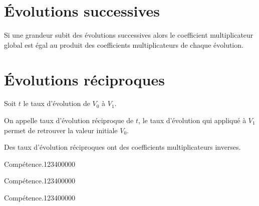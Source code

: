 \begin{pageCours} %


\section{Évolutions successives}

\begin{Pp}
Si une grandeur subit des évolutions successives alors le coefficient multiplicateur global est égal au produit des coefficients multiplicateurs de chaque évolution.
\end{Pp}

\section{Évolutions réciproques}

\begin{Def}
Soit $t$ le taux d'évolution de $V_0$ à $V_1$.

On appelle taux d'évolution réciproque de $t$, le taux d'évolution qui appliqué à $V_1$ permet de retrouver la valeur initiale $V_0$.
\end{Def}

\begin{Pp}
Des taux d'évolution réciproques ont des coefficients multiplicateurs inverses.
\end{Pp}

\end{pageCours} %


\begin{pageAD}  %
\restoregeometry %


\begin{ExoCad}{Compétence.}{1234}{0}{0}{0}{0}{0}

\end{ExoCad}


\begin{ExoCad}{Compétence.}{1234}{0}{0}{0}{0}{0}

\end{ExoCad}


\begin{ExoCad}{Compétence.}{1234}{0}{0}{0}{0}{0}

\end{ExoCad}
 
\end{pageAD} %


